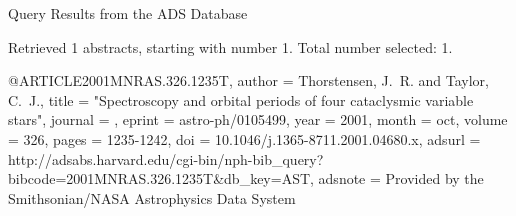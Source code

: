 Query Results from the ADS Database


Retrieved 1 abstracts, starting with number 1.  Total number selected: 1.

@ARTICLE{2001MNRAS.326.1235T,
   author = {{Thorstensen}, J.~R. and {Taylor}, C.~J.},
    title = "{Spectroscopy and orbital periods of four cataclysmic variable stars}",
  journal = {\mnras},
   eprint = {astro-ph/0105499},
     year = 2001,
    month = oct,
   volume = 326,
    pages = {1235-1242},
      doi = {10.1046/j.1365-8711.2001.04680.x},
   adsurl = {http://adsabs.harvard.edu/cgi-bin/nph-bib_query?bibcode=2001MNRAS.326.1235T&db_key=AST},
  adsnote = {Provided by the Smithsonian/NASA Astrophysics Data System}
}


